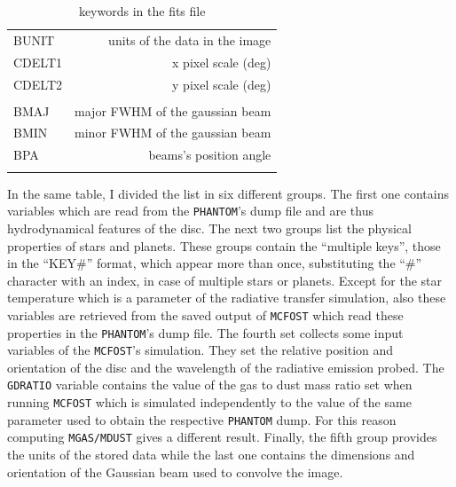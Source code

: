 \documentclass[a4paper,10pt]{report}
\begin{document}
\begin{table}
\begin{center}
\begin{tabular}{l r}
        BUNIT & units of the data in the image \\ 
        CDELT1 & x pixel scale (deg) \\
        CDELT2 & y pixel scale (deg)\\ \\
        
        BMAJ & major FWHM of the gaussian beam \\
        BMIN & minor FWHM of the gaussian beam\\
        BPA & beams's position angle \\ \\
        

         \bottomrule
        \end{tabular}
        \end{center}

        \caption{keywords in the fits file}
\end{table}

In the same table, I divided the list in six different groups. The first one contains
variables which are read from the \lstinline{PHANTOM}'s dump file and are thus hydrodynamical features of
the disc. The next two groups list the physical properties of stars and planets. These groups contain the 
``multiple keys'', those in the ``KEY\#'' format, which appear more than once, substituting the ``\#'' character with an index,
in case of multiple stars or planets.
Except for the star temperature which is a parameter of the radiative transfer simulation, also these variables are retrieved from
the saved output of \lstinline{MCFOST} which read these properties in the \lstinline{PHANTOM}'s dump file.
The fourth set collects some input variables of the \lstinline{MCFOST}'s simulation.
They set the relative position and orientation of the disc and the wavelength of the radiative emission probed.
The \lstinline{GDRATIO} variable contains the value of the gas to dust mass ratio set when running \lstinline{MCFOST}
which is simulated
independently to the value of the same parameter used to obtain the respective \lstinline{PHANTOM} dump. For
this reason computing \lstinline{MGAS/MDUST} gives a different result.
Finally, the fifth group provides the units of the stored data while the last one contains
the dimensions and orientation of the Gaussian beam used to convolve the image.
\end{document}

